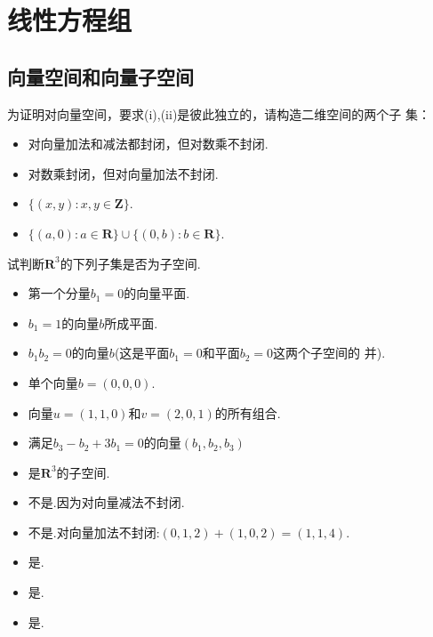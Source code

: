 ﻿\documentclass{book} \usepackage{exsheets} \usepackage{xeCJK}
\begin{document}
\chapter{线性方程组}
\section{向量空间和向量子空间}
\begin{question}
  为证明对向量空间，要求(i),(ii)是彼此独立的，请构造二维空间的两个子
  集：
  \begin{itemize}
  \item     对向量加法和减法都封闭，但对数乘不封闭.
  \item     对数乘封闭，但对向量加法不封闭.
  \end{itemize}
\end{question}
\begin{solution}
  \begin{itemize}
  \item     $\{(x,y):x,y\in \mathbf{Z}\}$.
  \item     $\{(a,0):a\in \mathbf{R}\}\cup \{(0,b):b\in \mathbf{R}\}$.
  \end{itemize}
\end{solution}
\begin{question}
  试判断$\mathbf{R}^3$的下列子集是否为子空间.
  \begin{itemize}
  \item     第一个分量$b_1=0$的向量平面.
  \item     $b_1=1$的向量$b$所成平面.
  \item     $b_1b_2=0$的向量$b$(这是平面$b_1=0$和平面$b_2=0$这两个子空间的
    并).
  \item     单个向量$b=(0,0,0)$.
  \item     向量$u=(1,1,0)$和$v=(2,0,1)$的所有组合.
  \item     满足$b_3-b_2+3b_1=0$的向量$(b_1,b_2,b_3)$
  \end{itemize}
\end{question}
\begin{solution}
  \begin{itemize}
  \item     是$\mathbf{R}^3$的子空间.
  \item     不是.因为对向量减法不封闭.
  \item     不是.对向量加法不封闭:$(0,1,2)+(1,0,2)=(1,1,4)$.
  \item     是.
  \item     是.
  \item     是.
  \end{itemize}
\end{solution}
\end{document}
